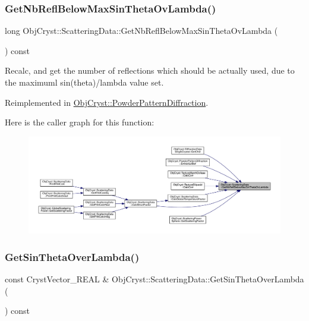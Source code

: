 \subsubsection{\texorpdfstring{GetNbReflBelowMaxSinThetaOvLambda()}{GetNbReflBelowMaxSinThetaOvLambda()}}
{\footnotesize\ttfamily long Obj\+Cryst\+::\+Scattering\+Data\+::\+Get\+Nb\+Refl\+Below\+Max\+Sin\+Theta\+Ov\+Lambda (\begin{DoxyParamCaption}{ }\end{DoxyParamCaption}) const\hspace{0.3cm}{\ttfamily [virtual]}}

Recalc, and get the number of reflections which should be actually used, due to the maximuml sin(theta)/lambda value set. 

Reimplemented in \mbox{\hyperlink{class_obj_cryst_1_1_powder_pattern_diffraction_a87785bf69fbd81df78c47f3d42efaf4e}{Obj\+Cryst\+::\+Powder\+Pattern\+Diffraction}}.

Here is the caller graph for this function\+:
\nopagebreak
\begin{figure}[H]
\begin{center}
\leavevmode
\includegraphics[width=350pt]{class_obj_cryst_1_1_scattering_data_aeceded13328adf88e001b08ce1abed7f_icgraph}
\end{center}
\end{figure}
\mbox{\label{class_obj_cryst_1_1_scattering_data_a27cf813d222bbc0b261f794051125219}} 
\subsubsection{\texorpdfstring{GetSinThetaOverLambda()}{GetSinThetaOverLambda()}}
{\footnotesize\ttfamily const Cryst\+Vector\+\_\+\+R\+E\+AL \& Obj\+Cryst\+::\+Scattering\+Data\+::\+Get\+Sin\+Theta\+Over\+Lambda (\begin{DoxyParamCaption}{ }\end{DoxyParamCaption}) const}

